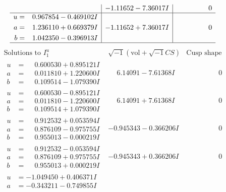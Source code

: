 \documentclass[1p]{elsarticle_modified}
\theoremstyle{definition}
\newcommand{\I}{\sqrt{-1}}
\begin{document}
$$\begin{array}{c|c|c}
 & -1.11652 - 7.36017 I & \phantom{-0.000000 } 0 \\ \hline\begin{aligned}
u &= \phantom{-}0.967854 - 0.469102 I \\
a &= \phantom{-}1.236110 + 0.669379 I \\
b &= \phantom{-}1.042350 - 0.396913 I\end{aligned}
 & -1.11652 + 7.36017 I & \phantom{-0.000000 } 0\\
 \hline 
 \end{array}$$\newpage$$\begin{array}{c|c|c}  
\text{Solutions to }I^u_{1}& \I (\text{vol} + \sqrt{-1}CS) & \text{Cusp shape}\\
 \hline 
\begin{aligned}
u &= \phantom{-}0.600530 + 0.895121 I \\
a &= \phantom{-}0.011810 + 1.220600 I \\
b &= \phantom{-}0.109514 - 1.079390 I\end{aligned}
 & \phantom{-}6.14091 - 7.61368 I & \phantom{-0.000000 } 0 \\ \hline\begin{aligned}
u &= \phantom{-}0.600530 - 0.895121 I \\
a &= \phantom{-}0.011810 - 1.220600 I \\
b &= \phantom{-}0.109514 + 1.079390 I\end{aligned}
 & \phantom{-}6.14091 + 7.61368 I & \phantom{-0.000000 } 0 \\ \hline\begin{aligned}
u &= \phantom{-}0.912532 + 0.053594 I \\
a &= \phantom{-}0.876109 - 0.975755 I \\
b &= \phantom{-}0.955013 - 0.000219 I\end{aligned}
 & -0.945343 - 0.366206 I & \phantom{-0.000000 } 0 \\ \hline\begin{aligned}
u &= \phantom{-}0.912532 - 0.053594 I \\
a &= \phantom{-}0.876109 + 0.975755 I \\
b &= \phantom{-}0.955013 + 0.000219 I\end{aligned}
 & -0.945343 + 0.366206 I & \phantom{-0.000000 } 0 \\ \hline\begin{aligned}
u &= -1.049450 + 0.406371 I \\
a &= -0.343211 - 0.749855 I \\

\end{aligned}
\end{array}$$
\end{document}
